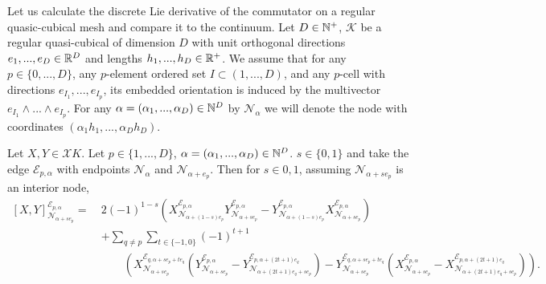 \begin{discussion}
  Let us calculate the discrete Lie derivative of the commutator on a regular
  quasic-cubical mesh and compare it to the continuum.
  Let $D \in \mathbb{N}^+$, $\mathcal{K}$ be a regular quasi-cubical of dimension $D$
  with unit orthogonal directions $e_1, ..., e_D \in \mathbb{R}^D$ and lengths
  $h_1, ..., h_D \in \mathbb{R}^+$.
  We assume that for any $p \in \{0, ..., D\}$, any $p$-element ordered set
  $I \subset (1, ..., D)$, and any $p$-cell with directions
  $e_{I_1}, ..., e_{I_p}$, its embedded orientation is induced by
  the multivector $e_{I_1} \wedge ... \wedge e_{I_p}$.
  For any $\alpha = (\alpha_1, ..., \alpha_D) \in \mathbb{N}^D$ by $\mathcal{N}_\alpha$
  we will denote the node with coordinates $(\alpha_1 h_1, ..., \alpha_D h_D)$.
  
  Let $X, Y \in \mathcal{X} K$.
  Let $p \in \{1, ..., D\}$, $\alpha = (\alpha_1, ..., \alpha_D) \in \mathbb{N}^D$.
  $s \in \{0, 1\}$ and take the edge
  $\mathcal{E}_{p, \alpha}$ with endpoints $\mathcal{N}_\alpha$ and
  $\mathcal{N}_{\alpha + e_p}$.
  Then for $s \in {0, 1}$, assuming $\mathcal{N}_{\alpha + s e_p}$
  is an interior node,
  \begin{equation}
    \begin{split}
      [X, Y]^{\mathcal{E}_{p, \alpha}}_{\mathcal{N}_{\alpha + s e_p}} =\
      & 2 (-1)^{1 - s}
      ( X^{\mathcal{E}_{p, \alpha}}_{\mathcal{N}_{\alpha + (1 - s) e_p}}
        Y^{\mathcal{E}_{p, \alpha}}_{\mathcal{N}_{\alpha + s e_p}}
        -
        Y^{\mathcal{E}_{p, \alpha}}_{\mathcal{N}_{\alpha + (1 - s) e_p}}
        X^{\mathcal{E}_{p, \alpha}}_{\mathcal{N}_{\alpha + s e_p}}
      ) \\
      & +
      \sum_{q \neq p}
        \sum_{t \in \{-1, 0\}}
          (-1)^{t + 1} \\
          & \qquad
          ( X^{\mathcal{E}_{q, \alpha + s e_p + t e_q}}
             _{\mathcal{N}_{\alpha + s e_p}}
            (Y^{\mathcal{E}_{p, \alpha}}_{\mathcal{N}_{\alpha + s e_p}}
             - Y^{\mathcal{E}_{p, \alpha + (2 t + 1) e_q}}
                _{\mathcal{N}_{\alpha + (2 t + 1) e_q + s e_p }})
            -
            Y^{\mathcal{E}_{q, \alpha + s e_p + t e_q}}
             _{\mathcal{N}_{\alpha + s e_p}}
            (X^{\mathcal{E}_{p, \alpha}}_{\mathcal{N}_{\alpha + s e_p}}
             - X^{\mathcal{E}_{p, \alpha + (2 t + 1) e_q}}
                _{\mathcal{N}_{\alpha + (2 t + 1) e_q + s e_p }})
          ).
    \end{split}
  \end{equation}

\end{discussion}
